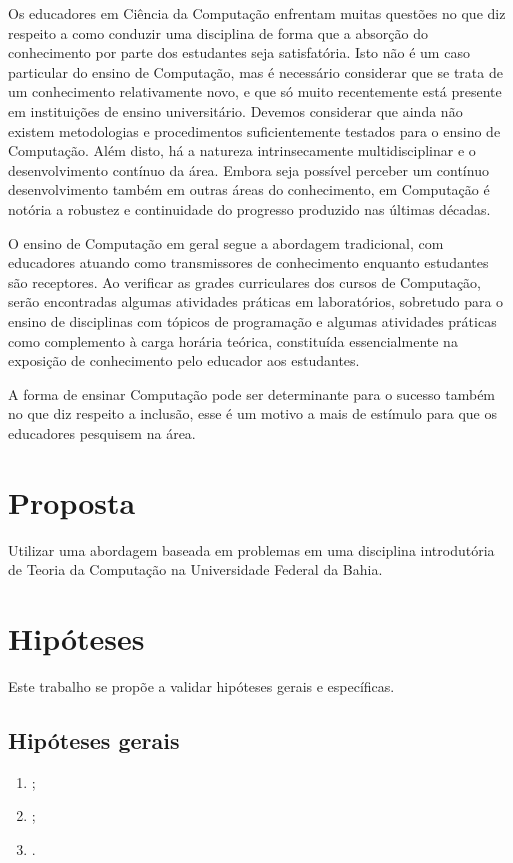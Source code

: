 \acresetall
\label{cap-introducao}
Os educadores em Ciência da Computação enfrentam muitas questões no que diz
respeito a como conduzir uma disciplina de forma que a absorção do conhecimento
por parte dos estudantes seja satisfatória.
Isto não é um caso particular do ensino de Computação,
mas é necessário considerar que se trata de
um conhecimento relativamente novo, e que só muito
recentemente está presente em instituições de ensino universitário.
Devemos considerar que ainda não existem metodologias e procedimentos
suficientemente testados para o ensino de Computação.
Além disto, há a natureza intrinsecamente multidisciplinar e
o desenvolvimento contínuo da área.
Embora seja possível perceber um contínuo desenvolvimento também em
outras áreas do conhecimento, em Computação é notória a robustez e
continuidade do progresso produzido nas últimas décadas.

O ensino de Computação em geral segue a abordagem tradicional,
com educadores atuando como transmissores de conhecimento
enquanto estudantes são receptores.
Ao verificar as grades curriculares dos cursos de Computação,
serão encontradas algumas atividades práticas em laboratórios,
sobretudo para o ensino de disciplinas com tópicos de programação e
algumas atividades práticas como complemento à carga horária teórica,
constituída essencialmente na exposição de conhecimento pelo educador
aos estudantes.

A forma de ensinar Computação pode ser determinante
para o sucesso também no que diz respeito a
inclusão, esse é um motivo a mais de estímulo para
que os educadores pesquisem na área.

\section{Proposta}
\label{sec-proposta}
Utilizar uma abordagem baseada em problemas em uma disciplina
introdutória de Teoria da Computação na Universidade Federal da Bahia.

\section{Hipóteses}
\label{sec-hipoteses}
Este trabalho se propõe a validar hipóteses gerais e específicas.

\subsection{Hipóteses gerais}
\label{sec-hipoteses-gerais}
\begin{enumerate}
\item{\label{hg1ref} \hgatexto;}
\item{\label{hg2ref} \hgbtexto;}
\item{\label{hg3ref} \hgctexto.}
\end{enumerate}

